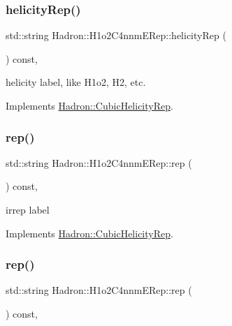 \subsubsection{\texorpdfstring{helicityRep()}{helicityRep()}\hspace{0.1cm}{\footnotesize\ttfamily [3/3]}}
{\footnotesize\ttfamily std\+::string Hadron\+::\+H1o2\+C4nnm\+E\+Rep\+::helicity\+Rep (\begin{DoxyParamCaption}{ }\end{DoxyParamCaption}) const\hspace{0.3cm}{\ttfamily [inline]}, {\ttfamily [virtual]}}

helicity label, like H1o2, H2, etc. 

Implements \mbox{\hyperlink{structHadron_1_1CubicHelicityRep_af1096946b7470edf0a55451cc662f231}{Hadron\+::\+Cubic\+Helicity\+Rep}}.

\mbox{\label{structHadron_1_1H1o2C4nnmERep_aa142fe62212d47d4993ca54c3f3ab655}} 
\subsubsection{\texorpdfstring{rep()}{rep()}\hspace{0.1cm}{\footnotesize\ttfamily [1/3]}}
{\footnotesize\ttfamily std\+::string Hadron\+::\+H1o2\+C4nnm\+E\+Rep\+::rep (\begin{DoxyParamCaption}{ }\end{DoxyParamCaption}) const\hspace{0.3cm}{\ttfamily [inline]}, {\ttfamily [virtual]}}

irrep label 

Implements \mbox{\hyperlink{structHadron_1_1CubicHelicityRep_a8cdd86f068a167dc96faef02bfb8a33d}{Hadron\+::\+Cubic\+Helicity\+Rep}}.

\mbox{\label{structHadron_1_1H1o2C4nnmERep_aa142fe62212d47d4993ca54c3f3ab655}} 
\subsubsection{\texorpdfstring{rep()}{rep()}\hspace{0.1cm}{\footnotesize\ttfamily [2/3]}}
{\footnotesize\ttfamily std\+::string Hadron\+::\+H1o2\+C4nnm\+E\+Rep\+::rep (\begin{DoxyParamCaption}{ }\end{DoxyParamCaption}) const\hspace{0.3cm}{\ttfamily [inline]}, {\ttfamily [virtual]}}

